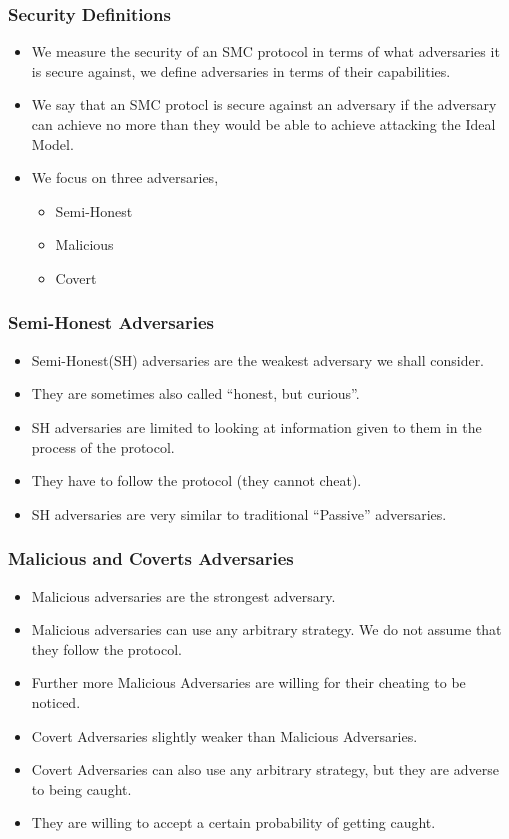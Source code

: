\documentclass{beamer}
\begin{document}
	\begin{frame}
		\frametitle{Security Definitions}
		
		\begin{itemize}

		\item We measure the security of an SMC protocol in terms of what adversaries it is secure against, we define adversaries in terms of their capabilities.

		\item We say that an SMC protocl is secure against an adversary if the adversary can achieve no more than they would be able to achieve attacking the Ideal Model.

		\item We focus on three adversaries,
			\begin{itemize}
			\item Semi-Honest 
			\item Malicious 
			\item Covert
			\end{itemize}
		\end{itemize}
	\end{frame}
	
	\begin{frame}
		\frametitle{Semi-Honest Adversaries}
		\begin{itemize}
			\item Semi-Honest(SH) adversaries are the weakest adversary we shall consider.
			\item They are sometimes also called ``honest, but curious''.
			\item SH adversaries are limited to looking at information given to them in the process of the protocol.
			\item They have to follow the protocol (they cannot cheat). 
			\item SH adversaries are very similar to traditional ``Passive'' adversaries.
		\end{itemize}
	\end{frame}

	\begin{frame}
		\frametitle{Malicious and Coverts Adversaries}
		\begin{itemize}
			\item Malicious adversaries are the strongest adversary.
			\item Malicious adversaries can use any arbitrary strategy. We do not assume that they follow the protocol.
			\item Further more Malicious Adversaries are willing for their cheating to be noticed.
			\bigskip
			\item Covert Adversaries slightly weaker than Malicious Adversaries.
			\item Covert Adversaries can also use any arbitrary strategy, but they are adverse to being caught.
			\item They are willing to accept a certain probability of getting caught.
		\end{itemize}
	\end{frame}
\end{document}
